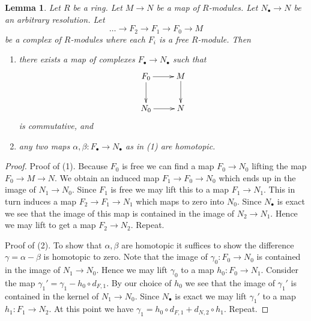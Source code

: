 \documentclass[10pt,a4paper]{amsart}
\theoremstyle{plain}
\newtheorem{lemma}[subsection]{Lemma}
\theoremstyle{definition}
\theoremstyle{remark}
\numberwithin{equation}{subsection}
\begin{document}
\begin{lemma}
\label{lemma-compare-resolutions}
Let $R$ be a ring. Let $M \to N$ be a map of $R$-modules.
Let $N_\bullet \to N$ be an arbitrary resolution.
Let
$$
\ldots \to F_2 \to F_1 \to F_0 \to M
$$
be a complex of $R$-modules where each $F_i$ is a free $R$-module. Then
\begin{enumerate}
\item there exists a map of complexes $F_\bullet \to N_\bullet$ such that
$$
\xymatrix{
F_0 \ar[r] \ar[d] & M \ar[d] \\
N_0 \ar[r] & N
}
$$
is commutative, and
\item any two maps $\alpha, \beta : F_\bullet \to N_\bullet$ as in (1)
are homotopic.
\end{enumerate}
\end{lemma}

\begin{proof}
Proof of (1). Because $F_0$ is free we can find a map $F_0 \to N_0$
lifting the map $F_0 \to M \to N$. We obtain an induced
map $F_1 \to F_0 \to N_0$ which ends up in the image
of $N_1 \to N_0$. Since $F_1$ is free we may lift this
to a map $F_1 \to N_1$. This in turn induces a map
$F_2 \to F_1 \to N_1$ which maps to zero into
$N_0$. Since $N_\bullet$ is exact we see that
the image of this map is contained in the image
of $N_2 \to N_1$. Hence we may lift to get a map
$F_2 \to N_2$. Repeat.

\medskip\noindent
Proof of (2). To show that $\alpha, \beta$ are homotopic it suffices
to show the difference $\gamma = \alpha - \beta$ is homotopic
to zero. Note that the image of $\gamma_0 : F_0 \to N_0$
is contained in the image of $N_1 \to N_0$. Hence we may lift
$\gamma_0$ to a map $h_0 : F_0 \to N_1$. Consider the map
$\gamma_1' = \gamma_1 - h_0 \circ d_{F, 1}$. By our choice of $h_0$
we see that the image of $\gamma_1'$ is contained in
the kernel of $N_1 \to N_0$. Since $N_\bullet$ is exact
we may lift $\gamma_1'$ to a map $h_1 : F_1 \to N_2$.
At this point we have $\gamma_1 = h_0 \circ d_{F, 1}
+ d_{N, 2} \circ h_1$. Repeat.
\end{proof}
\end{document}

